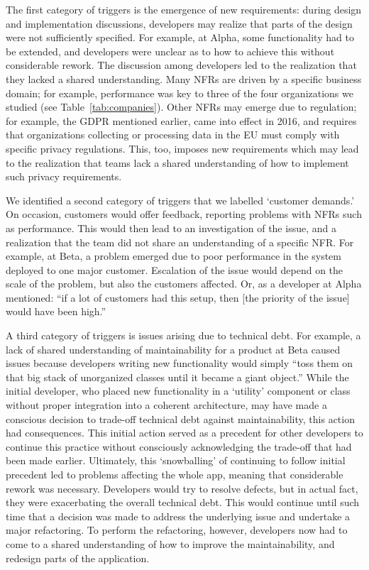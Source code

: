 \documentclass[smallextended]{svjour3}       %
\begin{document}
The first category of triggers is the emergence of new requirements: during design and implementation discussions, developers may realize that parts of the design were not sufficiently specified. For example, at Alpha, some functionality had to be extended, and developers were unclear as to how to achieve this without considerable rework. The discussion among developers led to the realization that they lacked a shared understanding.
Many NFRs are driven by a specific business domain; for example, performance was key to three of the four organizations we studied (see Table~\ref{tab:companies}). Other NFRs may emerge due to regulation; for example, the 
GDPR mentioned earlier, came into effect in 2016, and requires that organizations collecting or processing data in the EU must comply with specific privacy regulations. This, too, imposes new requirements which may lead to the realization that teams lack a shared understanding of how to implement such privacy requirements.

We identified a second category of triggers that we labelled `customer demands.' On occasion, customers would offer feedback, reporting problems with NFRs such as performance. This would then lead to an investigation of the issue, and a realization that the team did not share an understanding of a specific NFR.  For example, at Beta, a problem emerged due to poor performance in the system deployed to one major customer. Escalation of the issue would depend on the scale of the problem, but also the customers affected. Or, as a developer at Alpha mentioned: \textmd{``if a lot of customers had this setup, then [the priority of the issue] would have been high.''}


A third category of triggers is issues arising due to technical debt. For example, a lack of shared understanding of maintainability for a product at Beta caused issues because developers writing new functionality would simply ``toss them on that big stack of unorganized classes until it became a giant object.'' While the initial developer, who placed new functionality in a `utility' component or class without proper integration into a coherent architecture, may have made a conscious decision to trade-off technical debt against maintainability,  this action had consequences. This initial action served as a precedent for other developers to continue this practice without consciously acknowledging the trade-off that had been made earlier. 
Ultimately, this `snowballing' of continuing to follow initial precedent led to problems affecting the whole app,
meaning that considerable rework was necessary. Developers would try to resolve defects, but in actual fact, they were exacerbating the overall technical debt. This would continue until such time that a decision was made to address the underlying issue and undertake a major refactoring. To perform the refactoring, however, developers now had to come to a shared understanding of how to improve the maintainability, and redesign parts of the application. 
\end{document}
